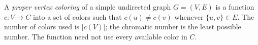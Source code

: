 
A \emph{proper vertex coloring} of a simple undirected graph $G=(V,E)$ is a function $c:V\to C$ into a set of colors such that $c(u)\ne c(v)$ whenever $\{u,v\}\in E$. The number of colors used is $|c(V)|$; the chromatic number is the least possible number. The function need not use every available color in $C$.

